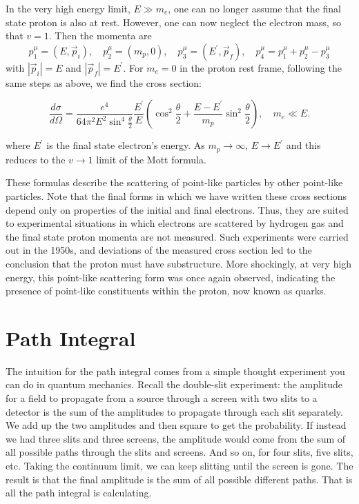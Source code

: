 \documentclass[11pt]{article}
\theoremstyle{definition}
\begin{document}
In the very high energy limit, $E\gg m_{e}$, one can no longer assume that the final state proton is also at rest. However, one can now neglect the electron mass, so that $v=1$. Then the momenta are
\begin{equation}
p_{1}^{\mu}=(E,\vec{p}_{i}), \quad p_{2}^{\mu}=(m_{p},0), \quad p_{3}^{\mu}=(E^{\prime},\vec{p}_{f}), \quad p_{4}^{\mu}=p_{1}^{\mu}+p_{2}^{\mu}-p_{3}^{\mu}
\end{equation}
with $|\vec{p}_{i}|=E$ and $|\vec{p}_{f}|=E^{\prime}$. For $m_{e}=0$ in the proton rest frame, following the same steps as above, we find the cross section:
\begin{shaded}
    \begin{equation}
\frac{d\sigma}{d\Omega}=\frac{e^{4}}{64\pi^{2}E^{2}\sin ^{4}\frac{\theta}{2}}\frac{E^{\prime}}{E}\left(\cos ^{2}\frac{\theta}{2}+\frac{E-E^{\prime}}{m_{p}}\sin ^{2}\frac{\theta}{2}\right), \quad m_{e}\ll E.
\end{equation}
\end{shaded}
where $E^{\prime}$ is the final state electron's energy. As $m_{p}\rightarrow\infty$, $E\rightarrow E^{\prime}$ and this reduces to the $v\rightarrow 1$ limit of the Mott formula.

These formulas describe the scattering of point-like particles by other point-like particles. Note that the final forms in which we have written these cross sections depend only on properties of the initial and final electrons. Thus, they are suited to experimental situations in which electrons are scattered by hydrogen gas and the final state proton momenta are not measured. Such experiments were carried out in the 1950s, and deviations of the measured cross section led to the conclusion that the proton must have substructure. More shockingly, at very high energy, this point-like scattering form was once again observed, indicating the presence of point-like constituents within the proton, now known as quarks.

\section{Path Integral}
The intuition for the path integral comes from a simple thought experiment you can do in quantum mechanics. Recall the double-slit experiment: the amplitude for a field to propagate from a source through a screen with two slits to a detector is the sum of the amplitudes to propagate through each slit separately. We add up the two amplitudes and then square to get the probability. If instead we had three slits and three screens, the amplitude would come from the sum of all possible paths through the slits and screens.  And so on, for four slits, five slits, etc. Taking the continuum limit, we can keep slitting until the screen is gone. The result is that the final amplitude is the sum of all possible different paths. That is all the path integral is calculating.
\end{document}
